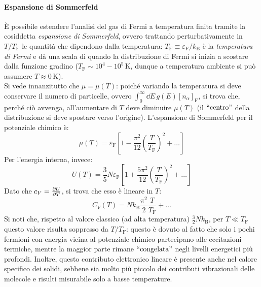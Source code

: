 \paragraph{Espansione di Sommerfeld}

È possibile estendere l'analisi del gas di Fermi a temperatura finita tramite la cosiddetta \textit{espansione di Sommerfeld}, ovvero trattando perturbativamente in $ T / T_\text{F} $ le quantità che dipendono dalla temperatura: $ T_\text{F} \equiv \varepsilon_\text{F} / k_\text{B} $ è la \textit{temperatura di Fermi} e dà una scala di quando la distribuzione di Fermi si inizia a scostare dalla funzione gradino ($ T_\text{F} \sim 10^4-10^5 \,\text{K} $, dunque a temperatura ambiente si può assumere $ T \approx 0 \,\text{K} $). \\
Si vede innanzitutto che $ \mu = \mu(T) $: poiché variando la temperatura si deve conservare il numero di particelle, ovvero $ \int_0^\infty \dd E\, g(E) [n_\alpha]_\text{F} $, si trova che, perché ciò avvenga, all'aumentare di $ T $ deve diminuire $ \mu(T) $ (il $ ``\text{centro}" $ della distribuzione si deve spostare verso l'origine). L'espansione di Sommerfeld per il potenziale chimico è:
\begin{equation}
	\mu(T) = \varepsilon_\text{F} \left[ 1 - \frac{\pi^2}{12} \left( \frac{T}{T_\text{F}} \right)^2 + \dots \right]
\end{equation}
Per l'energia interna, invece:
\begin{equation}
	U(T) = \frac{3}{5} N \varepsilon_\text{F} \left[ 1 + \frac{5\pi^2}{12} \left( \frac{T}{T_\text{F}} \right)^2 + \dots \right]
\end{equation}
Dato che $ c_V = \frac{\partial U}{\partial T} $, si trova che esso è lineare in $ T $:
\begin{equation}
	C_V(T) = N k_\text{B} \frac{\pi^2}{2} \frac{T}{T_\text{F}} + \dots
\end{equation}
Si noti che, rispetto al valore classico (ad alta temperatura) $ \frac{3}{2} N k_\text{B} $, per $ T \ll T_\text{F} $ questo valore risulta soppresso da $ T / T_\text{F} $: questo è dovuto al fatto che solo i pochi fermioni con energia vicina al potenziale chimico partecipano alle eccitazioni termiche, mentre la maggior parte rimane $ ``\text{congelata}" $ negli livelli energetici più profondi. Inoltre, questo contributo elettronico lineare è presente anche nel calore specifico dei solidi, sebbene sia molto più piccolo dei contributi vibrazionali delle molecole e risulti misurabile solo a basse temperature.

